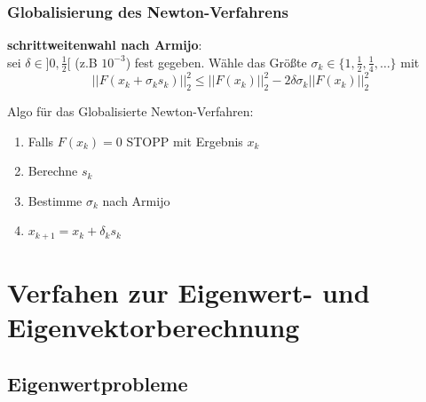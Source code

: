 \documentclass[
	ngerman,
	accentcolor=9c,%
	type=intern,
	marginpar=false
	]{tudapub}
\begin{document}
            \subsubsection{Globalisierung des Newton-Verfahrens}
                \textbf{schrittweitenwahl nach Armijo}:\\
                sei $\delta \in ]0, \frac{1}{2}[$ (z.B $10^{-3}$) fest gegeben. 
                Wähle das Größte $\sigma_k \in \{1, \frac{1}{2}, \frac{1}{4}, \dots\}$ mit 
                \begin{equation*}
                    ||F(x_k + \sigma_k s_k)||_2^2 \leq ||F(x_k)||_2^2-2\delta \sigma_k ||F(x_k)||_2^2
                \end{equation*} 
                \begin{satz}
                    Algo für das Globalisierte Newton-Verfahren:
                    \begin{enumerate}
                        \item Falls $F(x_k) = 0$ STOPP mit Ergebnis $x_k$
                        \item Berechne $s_k$
                        \item Bestimme $\sigma_k$ nach Armijo
                        \item $x_{k+1} = x_k + \delta_ks_k$
                    \end{enumerate}
                \end{satz}\newpage
    \section{Verfahen zur Eigenwert- und Eigenvektorberechnung}
        \subsection{Eigenwertprobleme}
\end{document}
